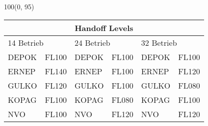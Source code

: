 \documentclass[10pt,landscape,a4paper]{article}
\begin{document}
\begin{textblock}{100}(0, 95)
\begin{table}[]
\begin{tabular}{llllll}
\multicolumn{6}{c}{\textbf{Handoff Levels}} \\ \hline
\multicolumn{2}{|l|}{14 Betrieb} & \multicolumn{2}{l|}{24 Betrieb} & \multicolumn{2}{l|}{32 Betrieb}\\ \hline
\multicolumn{1}{|l}{DEPOK} & \multicolumn{1}{l|}{FL100} & \multicolumn{1}{l}{DEPOK} & \multicolumn{1}{l}{FL100} & \multicolumn{1}{|l}{DEPOK} & \multicolumn{1}{l|}{FL100} \\ 
\multicolumn{1}{|l}{ERNEP} & \multicolumn{1}{l|}{FL140} & \multicolumn{1}{l}{ERNEP} & \multicolumn{1}{l}{FL100} & \multicolumn{1}{|l}{ERNEP} & \multicolumn{1}{l|}{FL120} \\
\multicolumn{1}{|l}{GULKO} & \multicolumn{1}{l|}{FL120} & \multicolumn{1}{l}{GULKO} & \multicolumn{1}{l}{FL100} & \multicolumn{1}{|l}{GULKO} & \multicolumn{1}{l|}{FL080} \\
\multicolumn{1}{|l}{KOPAG} & \multicolumn{1}{l|}{FL100} & \multicolumn{1}{l}{KOPAG} & \multicolumn{1}{l}{FL080} & \multicolumn{1}{|l}{KOPAG} & \multicolumn{1}{l|}{FL100} \\
\multicolumn{1}{|l}{NVO} & \multicolumn{1}{l|}{FL100} & \multicolumn{1}{l}{NVO} & \multicolumn{1}{l}{FL120} & \multicolumn{1}{|l}{NVO} & \multicolumn{1}{l|}{FL120} \\ \hline
\end{tabular}
\end{table}
\end{textblock}
\end{document}
